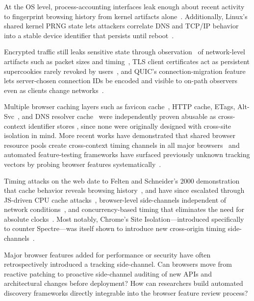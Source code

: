 %
At the OS level, process-accounting interfaces leak enough about recent activity to fingerprint browsing history from kernel artifacts alone~\cite{janaMementoLearningSecrets2012}. 
%
Additionally, Linux's shared kernel PRNG state lets attackers correlate DNS and TCP/IP behavior into a stable device identifier that persists until reboot~\cite{kleinCrossLayerAttacks2021,kol2023device}.


%
Encrypted traffic still leaks sensitive state through observation \symObservation\ of network-level artifacts such as packet sizes and timing~\cite{chenSideChannelLeaksWeb2010,gonzalezUserProfilingTime2016}, TLS client certificates act as persistent supercookies rarely revoked by users~\cite{foppeExploitingTLSClient2018}, and QUIC's connection-migration feature lets server-chosen connection IDs be encoded and visible to on-path observers even as clients change networks~\cite{syQUICLookWeb2019}. 


%
Multiple browser caching layers such as favicon cache~\cite{solomosTalesFaviconsCaches2021}, HTTP cache, ETags, Alt-Svc~\cite{mishraDejaVuAbusing2021}, and DNS resolver cache~\cite{klein2019dns} were independently proven abusable as cross-context identifier stores \symStorage, since none were originally designed with cross-site isolation in mind.
%
More recent works have demonstrated that shared browser resource pools create cross-context timing channels in all major browsers~\cite{snyderPoolPartyExploitingBrowser2023} and automated feature-testing frameworks have surfaced previously unknown tracking vectors by probing browser features systematically~\cite{aliNavigatingMurkyWaters2023}.


%
Timing attacks on the web date to Felten and Schneider's 2000 demonstration that cache behavior reveals browsing history~\cite{feltenTimingAttacksWeb2000}, and have since escalated through JS-driven CPU cache attacks~\cite{orenSpySandboxPractical2015}, browser-level side-channels independent of network conditions~\cite{van2015clock}, and concurrency-based timing that eliminates the need for absolute clocks~\cite{van2020timeless}.
%
Most notably, Chrome's Site Isolation---introduced specifically to counter Spectre---was itself shown to introduce new cross-origin timing side-channels~\cite{jinTimingBasedBrowsingPrivacy2022}.


\begin{opbox}
Major browser features added for performance or security have often retrospectively introduced a tracking side-channel. Can browsers move from reactive patching to proactive side-channel auditing of new APIs and architectural changes before deployment? How can researchers build automated discovery frameworks directly integrable into the browser feature review process?
\end{opbox}

